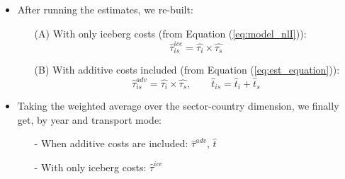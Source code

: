 \documentclass[10 pt,Helvetica, french]{beamer}
\begin{document}
\begin{frame}
\begin{itemize}
\item After running the estimates, we re-built: \vspace{0.1cm}
\begin{itemize}
\item[(A)] With only iceberg costs (from Equation (\ref{eq:model_nlI})):
$$\widehat{\tau}^{ice}_{is} = \widehat{\tau_{i}} \times \widehat{\tau_{s}}$$
\item[(B)] With additive costs included (from Equation (\ref{eq:est_equation})):
$$\widehat{\tau}^{adv}_{is} = \widehat{\tau_{i}} \times \widehat{\tau_{s}}, \qquad \widehat{t}_{is} = \widehat{t}_{i} + \widehat{t}_{s}$$
\end{itemize}
\item  Taking the weighted average over the sector-country dimension, we finally get, by year and transport mode: \vspace{0.1cm}
\begin{itemize}
\item[-] When additive costs are included: $\widehat{\tau}^{adv}$, $\widehat{t}$  \vspace{0.1cm}
\item[-] With only iceberg costs: $\widehat{\tau}^{ice}$
\end{itemize}
\end{itemize}
\end{frame}
\end{document}
